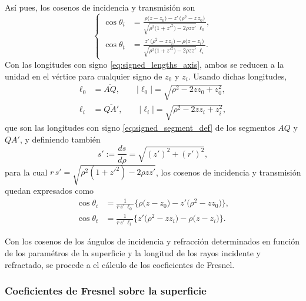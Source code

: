 Así pues, los cosenos de incidencia y transmisión son
\begin{equation}
\left\{
\begin{aligned}
\cos\theta_i
&=
\frac{
\rho\big(z - z_0\big) - z'\,\big(\rho^2 - z\,z_0\big)
}
{
\sqrt{\rho^2\big(1+z'^2\big) - 2\rho z z'}\;
\ell_0
},
\\
\cos\theta_t
&=
\frac{
z'\,\big(\rho^2 - z\,z_i\big) - \rho\big(z - z_i\big)
}
{
\sqrt{\rho^2\big(1+z'^2\big) - 2\rho z z'}\;
\ell_i
}.
\end{aligned}
\right.
\label{cosines_ovoid_compact}
\end{equation}
Con las longitudes con signo \eqref{eq:signed_lengths_axis}, ambos se reducen a la unidad en el vértice para cualquier signo de $z_0$ y $z_i$. Usando dichas longitudes,
\begin{align}
\ell_0
&=
\overline{AQ},
\qquad
|\ell_0|=\sqrt{\rho^2 - 2zz_0 + z_0^2},
\label{eq:l0_definition}
\\
\ell_i
&=
\overline{QA'},
\qquad
|\ell_i|=\sqrt{\rho^2 - 2zz_i + z_i^2},
\label{eq:l0_li_definitions}
\end{align}
que son las longitudes con signo \eqref{eq:signed_segment_def} de los segmentos $AQ$ y $QA'$, y definiendo también
\begin{equation}
  s'
  :=
  \frac{ds}{d\rho}
  =
  \sqrt{(z')^2 + (r')^2},
  \label{eq:ds_drho}
\end{equation}
para la cual $r\,s'=\sqrt{\rho^2(1+z'^2)-2\rho z z'}$, los cosenos de incidencia y transmisión quedan expresados como
\begin{equation}
\begin{aligned}
  \cos\theta_i
  &=
  \frac{1}{r\,s'\,\ell_0}
  \big\{
  \rho\big(z - z_0\big)
  -
  z'\big(\rho^2 - z z_0\big)
  \big\},
\\
  \cos\theta_t
  &=
  \frac{1}{r\,s'\,\ell_i}
  \big\{
  z'\big(\rho^2 - z z_i\big)
  -
  \rho\big(z - z_i\big)
  \big\}.
\end{aligned}
\label{cosines_ovoid}
\end{equation}


Con los cosenos de los ángulos de incidencia y refracción determinados en función de los paramétros de la superficie y la longitud de los rayos incidente y refractado, se procede a el cálculo de los coeficientes de Fresnel.


\subsubsection{Coeficientes de Fresnel sobre la superficie}

